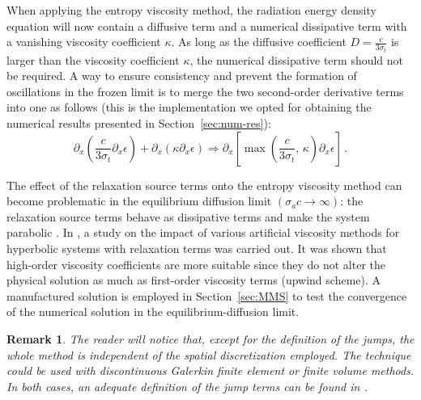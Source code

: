 \documentclass[review]{elsarticle}
\newtheorem{remark}{Remark}[section]
\newcommand{\sect}[1]{Section~\ref{#1}}                     %
\newcommand{\tcr}[1]{\textcolor{red}{#1}}
\newcommand{\tcb}[1]{\textcolor{blue}{#1}}
\begin{document}
When applying the entropy viscosity method, the radiation energy density equation will now contain a diffusive term and a numerical dissipative term with a vanishing viscosity coefficient $\kappa$. As long as the diffusive coefficient $D=\frac{c}{3 \sigma_t}$ is larger than the viscosity coefficient $\kappa$, the numerical dissipative term should not be required. A way to ensure consistency and prevent the formation of oscillations in the frozen limit is to merge the two second-order derivative terms into one as follows (this is the implementation we opted for obtaining the numerical results presented in \sect{sec:num-res}):
\begin{equation}
 \partial_x \left( \frac{c}{3 \sigma_t} \partial_x \epsilon \right) + \partial_x \left( \kappa \partial_x \epsilon \right) 
 \Longrightarrow
 \partial_x \left[ \max\left(\frac{c}{3 \sigma_t} \text{, } \kappa \right) \partial_x \epsilon \right] \,.
\end{equation}

The effect of the relaxation source terms onto the entropy viscosity method can become problematic in the equilibrium diffusion limit $(\sigma_a c \to \infty)$: the relaxation source terms behave as dissipative terms and make the system parabolic \cite{Leveque}. In \cite{ShiJin}, a study on the impact of various artificial viscosity methods for hyperbolic systems with relaxation terms was carried out. It was shown that high-order viscosity coefficients are more suitable since they do not alter the physical solution as much as first-order viscosity terms (upwind scheme). A manufactured  solution is employed in \sect{sec:MMS} to test the convergence of the numerical solution in the equilibrium-diffusion limit.  
%
 \begin{remark}
The reader will notice that, except for the definition of the jumps, the whole method is independent of the spatial discretization employed. The technique could be used with discontinuous Galerkin finite element or finite volume methods. In both cases, an adequate  definition of the jump terms can be found in \cite{valentin}.
 \end{remark}
%
\end{document}
